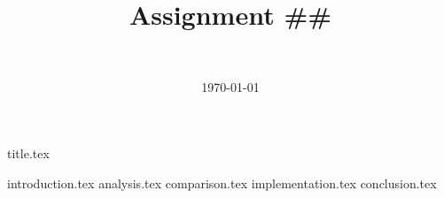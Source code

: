 \documentclass[final]{report}
\title{Assignment \#\#}
\author{~}
\date{\today}
\begin{document}

{title.tex}
\newpage
\tableofcontents

\newpage
{}
{introduction.tex}
\newpage
{analysis.tex}
{comparison.tex}
{implementation.tex}
{conclusion.tex}

\end{document}

